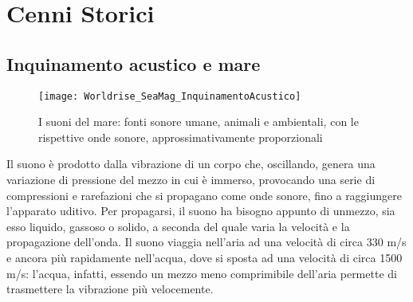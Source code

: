 
\chapter{Cenni Storici}

\section {Inquinamento acustico e mare}
\begin{figure}[h]
\centering
\texttt{[image: Worldrise\_SeaMag\_InquinamentoAcustico]}
\caption{I suoni del mare: fonti sonore umane, animali e ambientali, con le rispettive onde sonore, approssimativamente proporzionali}
\end{figure}

Il suono è prodotto dalla vibrazione di un corpo che, oscillando, genera una variazione di pressione del mezzo in cui è immerso, provocando una serie di compressioni e rarefazioni che si propagano come onde sonore, fino a raggiungere l’apparato uditivo. 
Per propagarsi, il suono ha bisogno appunto di unmezzo, sia esso liquido, gassoso o solido, a seconda del quale varia la velocità e la propagazione dell’onda. 
Il suono viaggia nell’aria ad una velocità di circa 330 m/s e ancora più rapidamente nell’acqua, dove si sposta ad una velocità di circa 1500 m/s: l’acqua, infatti, essendo un mezzo meno comprimibile dell’aria permette di trasmettere la vibrazione più velocemente.

